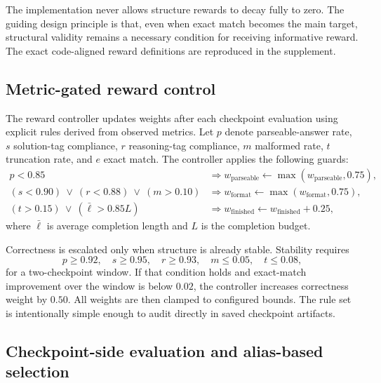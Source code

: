\documentclass{article} %
\begin{document}
The implementation never allows structure rewards to decay fully to zero. The guiding design principle is that, even when exact match becomes the main target, structural validity remains a necessary condition for receiving informative reward. The exact code-aligned reward definitions are reproduced in the supplement.

\subsection{Metric-gated reward control}

The reward controller updates weights after each checkpoint evaluation using explicit rules derived from observed metrics. Let $p$ denote parseable-answer rate, $s$ solution-tag compliance, $r$ reasoning-tag compliance, $m$ malformed rate, $t$ truncation rate, and $e$ exact match. The controller applies the following guards:
\begin{align}
p < 0.85 &\Rightarrow w_{\text{parseable}} \leftarrow \max(w_{\text{parseable}}, 0.75),\\
(s < 0.90)\ \vee\ (r < 0.88)\ \vee\ (m > 0.10) &\Rightarrow w_{\text{format}} \leftarrow \max(w_{\text{format}}, 0.75),\\
(t > 0.15)\ \vee\ (\bar{\ell} > 0.85L) &\Rightarrow w_{\text{finished}} \leftarrow w_{\text{finished}} + 0.25,
\end{align}
where $\bar{\ell}$ is average completion length and $L$ is the completion budget.

Correctness is escalated only when structure is already stable. Stability requires
\begin{equation}
p \ge 0.92,\quad s \ge 0.95,\quad r \ge 0.93,\quad m \le 0.05,\quad t \le 0.08,
\end{equation}
for a two-checkpoint window. If that condition holds and exact-match improvement over the window is below $0.02$, the controller increases correctness weight by $0.50$. All weights are then clamped to configured bounds. The rule set is intentionally simple enough to audit directly in saved checkpoint artifacts.

\subsection{Checkpoint-side evaluation and alias-based selection}
\end{document}
